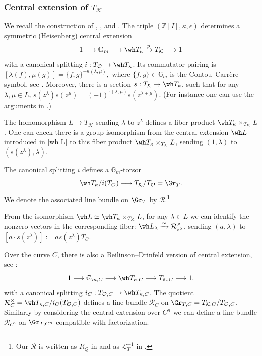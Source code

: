 \documentclass{amsart}
\numberwithin{equation}{section}
\numberwithin{figure}{section}
\theoremstyle{definition}
\theoremstyle{remark}
\renewcommand{\c}[1]{\mathcal{#1}}
\renewcommand{\b}[1]{\mathbb{#1}}
\begin{document}
\subsubsection{Central extension of $T_\c K$}
\label{subsubsec:torus-central-extension}
We recall the construction of \cite[3.2.1]{zhu2009affine},
\cite[17.1]{GaitsgoryCFT}, and
\cite[1.4--1.7]{BeilinsonHeisenberg}. 
The triple $(\b Z[I],\kappa,\epsilon)$ determines a symmetric (Heisenberg) central extension
\[
1\longrightarrow\b G_m\longrightarrow\wh T_\kappa
\xrightarrow{p}T_{\c K}\longrightarrow1
\]
with a canonical splitting
$i:T_{\c O}\to\wh T_\kappa$. Its commutator pairing is $[\lambda(f),\mu(g)]
=\{f,g\}^{-\kappa(\lambda,\mu)},$
where $\{f,g\}\in\b G_m$ is the Contou--Carr\`ere symbol, see \cite[3.2.1]{zhu2009affine}. Moreover, there is a section $s:T_\c K\to \wh T_\kappa$, such that for any $\lambda,\mu\in L$, $s(z^\lambda)s(z^\mu)=(-1)^{\epsilon(\lambda,\mu)}s(z^{\lambda+\mu})$. (For instance one can use the arguments in \cite[5.5]{kac1998vertex}.)

The homomorphism $L\to T_{\c K}$ sending $\lambda$ to $z^\lambda$ defines a fiber product 
$\wh T_\kappa\times_{T_{\c K}}L$.
One can check there is a group isomorphism from the central extension $\wh L$ introduced in \ref{wh L} to this fiber product 
$\wh T_\kappa\times_{T_{\c K}}L$, sending 
$(1,\lambda)$ to $(s(z^\lambda),\lambda)$. 


The canonical splitting $i$ defines a $\b G_m$-torsor
\[
\wh T_\kappa/i(T_{\c O})
\longrightarrow T_{\c K}/T_{\c O}=\Gr_T.
\]
We denote the associated line bundle on $\Gr_T$ by $\c R$.\footnote{Our
$\c R$ is written as $R_Q$ in \cite[17.1]{GaitsgoryCFT} and
as $\c L_T^{-1}$ in \cite[3.2.1]{zhu2009affine}.}

From the isomorphism $\wh L\simeq \wh T_\kappa\times_{T_{\c K}}L$, for any $\lambda\in L$ we can identify the nonzero vectors in the
corresponding fiber:
$\wh L_\lambda
\xrightarrow{\sim}\c R^\times_{z^\lambda}$, sending $
(a,\lambda)$ to $[a\cdot s(z^\lambda)]:=as(z^\lambda)T_\c O.$

 Over the curve $C$, there is also a Beilinson--Drinfeld version of central extension, see \cite[2.2--2.4]{BeilinsonHeisenberg}:
\[
1\longrightarrow\b G_{m,C}\longrightarrow\wh T_{\kappa,C}
\longrightarrow T_{\c K,C}\longrightarrow1.
\]
with a canonical splitting
$i_C:T_{\c O,C}\to\wh T_{\kappa,C}.$
The quotient
$\c R_C^\times=\wh T_{\kappa,C}/i_C(T_{\c O,C})$
defines a line bundle $\c R_C$ on
$\Gr_{T,C}=T_{\c K,C}/T_{\c O,C}$. Similarly by considering the central extension over $C^n$ we can define a line bundle
$\c R_{C^n}$ on $\Gr_{T,C^n}$ compatible with factorization.
\end{document}
